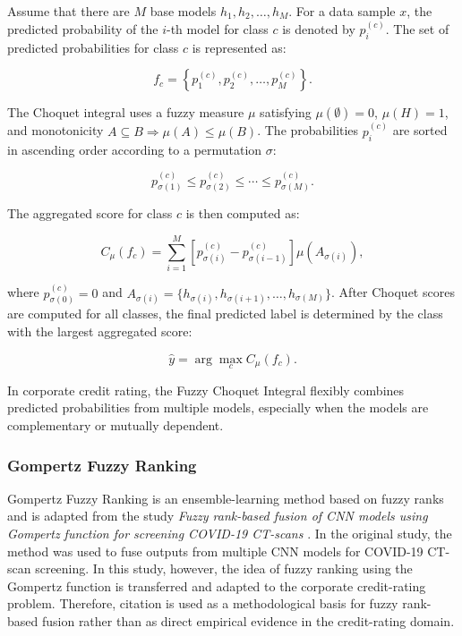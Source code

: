\documentclass[10pt,twoside]{article}
\begin{document}
Assume that there are $M$ base models $h_1,h_2,\ldots,h_M$. For a data sample $x$, the predicted probability of the $i$-th model for class $c$ is denoted by $p_i^{(c)}$. The set of predicted probabilities for class $c$ is represented as:

\begin{equation}
    f_c = \left\{p_1^{(c)}, p_2^{(c)}, \ldots, p_M^{(c)}\right\}.
\end{equation}

The Choquet integral uses a fuzzy measure $\mu$ satisfying $\mu(\emptyset)=0$, $\mu(H)=1$, and monotonicity $A \subseteq B \Rightarrow \mu(A) \leq \mu(B)$. The probabilities $p_i^{(c)}$ are sorted in ascending order according to a permutation $\sigma$:

\begin{equation}
    p_{\sigma(1)}^{(c)} \leq p_{\sigma(2)}^{(c)} \leq \cdots \leq p_{\sigma(M)}^{(c)}.
\end{equation}

The aggregated score for class $c$ is then computed as:

\begin{equation}
    C_{\mu}(f_c) =
    \sum_{i=1}^{M}
    \left[p_{\sigma(i)}^{(c)} - p_{\sigma(i-1)}^{(c)}\right]
    \mu(A_{\sigma(i)}),
\end{equation}

where $p_{\sigma(0)}^{(c)}=0$ and $A_{\sigma(i)}=\{h_{\sigma(i)},h_{\sigma(i+1)},\ldots,h_{\sigma(M)}\}$. After Choquet scores are computed for all classes, the final predicted label is determined by the class with the largest aggregated score:

\begin{equation}
    \hat{y} = \arg\max_c C_{\mu}(f_c).
\end{equation}

In corporate credit rating, the Fuzzy Choquet Integral flexibly combines predicted probabilities from multiple models, especially when the models are complementary or mutually dependent.

\subsubsection{Gompertz Fuzzy Ranking}

Gompertz Fuzzy Ranking is an ensemble-learning method based on fuzzy ranks and is adapted from the study \textit{Fuzzy rank-based fusion of CNN models using Gompertz function for screening COVID-19 CT-scans} \cite{kundu_fuzzy_2021}. In the original study, the method was used to fuse outputs from multiple CNN models for COVID-19 CT-scan screening. In this study, however, the idea of fuzzy ranking using the Gompertz function is transferred and adapted to the corporate credit-rating problem. Therefore, citation \cite{kundu_fuzzy_2021} is used as a methodological basis for fuzzy rank-based fusion rather than as direct empirical evidence in the credit-rating domain.
\end{document}
